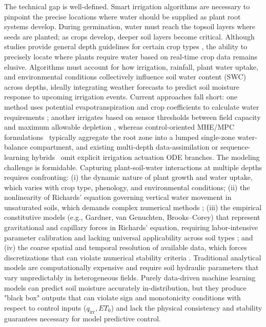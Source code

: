 \documentclass[pdflatex,sn-nature]{sn-jnl}%
\theoremstyle{thmstyleone}%
\theoremstyle{thmstyletwo}%
\theoremstyle{thmstylethree}%
\begin{document}
The technical gap is well-defined. Smart irrigation algorithms are necessary to pinpoint the precise locations where water should be supplied as plant root systems develop. During germination, water must reach the topsoil layers where seeds are planted; as crops develop, deeper soil layers become critical. Although studies provide general depth guidelines for certain crop types \cite{ASABE2021}, the ability to precisely locate where plants require water based on real-time crop data remains elusive. Algorithms must account for how irrigation, rainfall, plant water uptake, and environmental conditions collectively influence soil water content (SWC) across depths, ideally integrating weather forecasts to predict soil moisture response to upcoming irrigation events. Current approaches fall short: one method uses potential evapotranspiration and crop coefficients to calculate water requirements \cite{Volk2024}; another irrigates based on sensor thresholds between field capacity and maximum allowable depletion \cite{zhang2021}, whereas control-oriented MHE/MPC formulations~\cite{condeforecast2024} typically aggregate the root zone into a lumped single-zone water-balance compartment, and existing multi-depth data-assimilation or sequence-learning hybrids~\cite{Zou2010, Jiang2025, Jiang2026} omit explicit irrigation actuation ODE branches.
The modeling challenge is formidable. Capturing plant-soil-water interactions at multiple depths requires confronting: (i) the dynamic nature of plant growth and water uptake, which varies with crop type, phenology, and environmental conditions; (ii) the nonlinearity of Richards' equation governing vertical water movement in unsaturated soils, which demands complex numerical methods \cite{Celia1990}; (iii) the empirical constitutive models (e.g., Gardner, van Genuchten, Brooks–Corey) that represent gravitational and capillary forces in Richards' equation, requiring labor-intensive parameter calibration and lacking universal applicability across soil types \cite{Pan2019}; and (iv) the coarse spatial and temporal resolution of available data, which forces discretizations that can violate numerical stability criteria \cite{Celia1990,leveque2007}. Traditional analytical models are computationally expensive and require soil hydraulic parameters that vary unpredictably in heterogeneous fields. Purely data-driven machine learning models can predict soil moisture accurately in-distribution, but they produce "black box" outputs that can violate sign and monotonicity conditions with respect to control inputs ($q_{\mathrm{irr}}, ET_0$) and lack the physical consistency and stability guarantees necessary for model predictive control.
\end{document}
